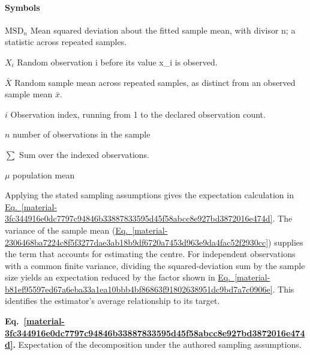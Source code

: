 \documentclass[11pt,a4paper]{article}
\begin{document}
\paragraph{Symbols}
\par\noindent\textbf{\(\mathrm{MSD}_n\)} Mean squared deviation about the fitted sample mean, with divisor n; a statistic across repeated samples.
\par\noindent\textbf{\(X_i\)} Random observation i before its value x\_i is observed.
\par\noindent\textbf{\(\bar X\)} Random sample mean across repeated samples, as distinct from an observed sample mean \ensuremath{\bar{x}}.
\par\noindent\textbf{\(i\)} Observation index, running from 1 to the declared observation count.
\par\noindent\textbf{\(n\)} number of observations in the sample
\par\noindent\textbf{\(\sum\)} Sum over the indexed observations.
\par\noindent\textbf{\(\mu\)} population mean
\medskip

Applying the stated sampling assumptions gives the expectation calculation in \hyperref[material-3fc344916e0dc7797c94846b33887833595d45f58abcc8e927bd3872016e474d]{Eq.~\ref*{material-3fc344916e0dc7797c94846b33887833595d45f58abcc8e927bd3872016e474d}}. The variance of the sample mean (\hyperref[material-2306468ba7224c8f5f3277dae3ab18b9df6720a7453d963e9da4fac52f2930cc]{Eq.~\ref*{material-2306468ba7224c8f5f3277dae3ab18b9df6720a7453d963e9da4fac52f2930cc}}) supplies the term that accounts for estimating the centre. For independent observations with a common finite variance, dividing the squared-deviation sum by the sample size yields an expectation reduced by the factor shown in \hyperref[material-b81ef95597ed67a6eba33a1ea10bbb4bf86863f91802638951dc9bd7a7c0906e]{Eq.~\ref*{material-b81ef95597ed67a6eba33a1ea10bbb4bf86863f91802638951dc9bd7a7c0906e}}. This identifies the estimator's average relationship to its target.


\par\medskip
{}
\label{material-3fc344916e0dc7797c94846b33887833595d45f58abcc8e927bd3872016e474d}
\noindent\textbf{Eq.~\ref*{material-3fc344916e0dc7797c94846b33887833595d45f58abcc8e927bd3872016e474d}.} Expectation of the decomposition under the authored sampling assumptions.\par\nopagebreak
\end{document}
